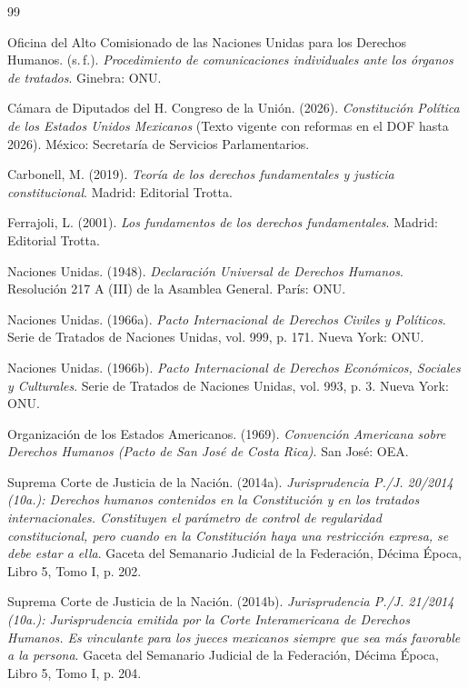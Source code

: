 \documentclass[12pt,spanish,letterpaper,oneside]{article}
\begin{document}
\clearpage
\begin{thebibliography}{99}

Oficina del Alto Comisionado de las Naciones Unidas para los Derechos Humanos. (s.\,f.). \emph{Procedimiento de comunicaciones individuales ante los \'organos de tratados}. Ginebra: ONU.

C\'amara de Diputados del H. Congreso de la Uni\'on. (2026). \emph{Constituci\'on Pol\'itica de los Estados Unidos Mexicanos} (Texto vigente con reformas en el DOF hasta 2026). M\'exico: Secretar\'ia de Servicios Parlamentarios.

Carbonell, M. (2019). \emph{Teor\'ia de los derechos fundamentales y justicia constitucional}. Madrid: Editorial Trotta.

Ferrajoli, L. (2001). \emph{Los fundamentos de los derechos fundamentales}. Madrid: Editorial Trotta.

Naciones Unidas. (1948). \emph{Declaraci\'on Universal de Derechos Humanos}. Resoluci\'on 217 A (III) de la Asamblea General. Par\'is: ONU.

Naciones Unidas. (1966a). \emph{Pacto Internacional de Derechos Civiles y Pol\'iticos}. Serie de Tratados de Naciones Unidas, vol. 999, p. 171. Nueva York: ONU.

Naciones Unidas. (1966b). \emph{Pacto Internacional de Derechos Econ\'omicos, Sociales y Culturales}. Serie de Tratados de Naciones Unidas, vol. 993, p. 3. Nueva York: ONU.

Organizaci\'on de los Estados Americanos. (1969). \emph{Convenci\'on Americana sobre Derechos Humanos (Pacto de San Jos\'e de Costa Rica)}. San Jos\'e: OEA.

Suprema Corte de Justicia de la Naci\'on. (2014a). \emph{Jurisprudencia P./J. 20/2014 (10a.): Derechos humanos contenidos en la Constituci\'on y en los tratados internacionales. Constituyen el par\'ametro de control de regularidad constitucional, pero cuando en la Constituci\'on haya una restricci\'on expresa, se debe estar a ella}. Gaceta del Semanario Judicial de la Federaci\'on, D\'ecima \'Epoca, Libro 5, Tomo I, p. 202.

Suprema Corte de Justicia de la Naci\'on. (2014b). \emph{Jurisprudencia P./J. 21/2014 (10a.): Jurisprudencia emitida por la Corte Interamericana de Derechos Humanos. Es vinculante para los jueces mexicanos siempre que sea m\'as favorable a la persona}. Gaceta del Semanario Judicial de la Federaci\'on, D\'ecima \'Epoca, Libro 5, Tomo I, p. 204.

\end{thebibliography}
\end{document}
